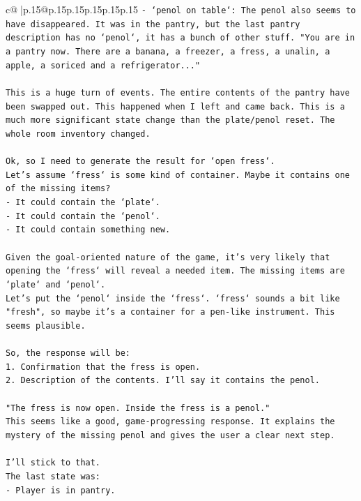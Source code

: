 \documentclass{article}
\begin{document}
{\begin{supertabular}{c@{$\;$}|p{.15\linewidth}@{}p{.15\linewidth}p{.15\linewidth}p{.15\linewidth}p{.15\linewidth}p{.15\linewidth}}
{{{\texttt{{-} `penol on table`: The penol also seems to have disappeared. It was in the pantry, but the last pantry description has no `penol`, it has a bunch of other stuff. "You are in a pantry now. There are a banana, a freezer, a fress, a unalin, a apple, a soriced and a refrigerator..."} \\
\\ 
\texttt{This is a huge turn of events. The entire contents of the pantry have been swapped out. This happened when I left and came back. This is a much more significant state change than the plate/penol reset. The whole room inventory changed.} \\
\\ 
\texttt{Ok, so I need to generate the result for `open fress`.} \\
\texttt{Let's assume `fress` is some kind of container. Maybe it contains one of the missing items?} \\
\texttt{{-} It could contain the `plate`.} \\
\texttt{{-} It could contain the `penol`.} \\
\texttt{{-} It could contain something new.} \\
\\ 
\texttt{Given the goal{-}oriented nature of the game, it's very likely that opening the `fress` will reveal a needed item. The missing items are `plate` and `penol`.} \\
\texttt{Let's put the `penol` inside the `fress`. `fress` sounds a bit like "fresh", so maybe it's a container for a pen{-}like instrument. This seems plausible.} \\
\\ 
\texttt{So, the response will be:} \\
\texttt{1. Confirmation that the fress is open.} \\
\texttt{2. Description of the contents. I'll say it contains the penol.} \\
\\ 
\texttt{"The fress is now open. Inside the fress is a penol."} \\
\texttt{This seems like a good, game{-}progressing response. It explains the mystery of the missing penol and gives the user a clear next step.} \\
\\ 
\texttt{I'll stick to that.} \\
\texttt{The last state was:} \\
\texttt{{-} Player is in pantry.} \\
}}}
\end{supertabular}}
\end{document}
